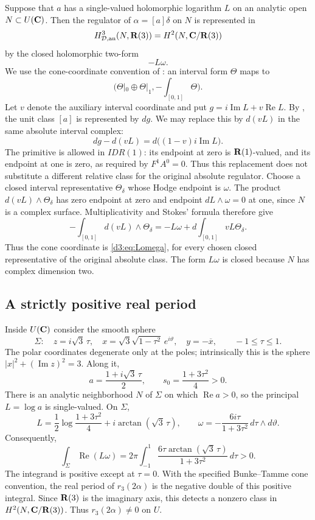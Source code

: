 Suppose that $a$ has a single-valued holomorphic logarithm $L$ on an analytic open $N\subset U(\mathbf C)$. Then the regulator of $\alpha=[a]\delta$ on $N$ is represented in
\[
H_{\mathcal D,\mathrm{an}}^3(N,\mathbf R(3))=H^2(N,\mathbf C/\mathbf R(3))
\]
by the closed holomorphic two-form
\begin{equation}\label{d3:eq:Lomega}
-L\omega.
\end{equation}
We use the cone-coordinate convention of \cite[Proposition~2.8]{BunkeTamme}: an interval form $\Theta$ maps to
\[
\bigl(\Theta|_0\oplus\Theta|_1,-\textstyle\int_{[0,1]}\Theta\bigr).
\]
Let $v$ denote the auxiliary interval coordinate and put $g=i\operatorname{Im}L+v\operatorname{Re}L$.
By \cite[Lemma~4.5]{BunkeTamme}, the unit class $[a]$ is represented by $dg$.
We may replace this by $d(vL)$ in the same absolute interval complex:
\[
dg-d(vL)=d\bigl((1-v)i\operatorname{Im}L\bigr).
\]
The primitive is allowed in $IDR(1)$: its endpoint at zero is
$\mathbf R(1)$-valued, and its endpoint at one is zero, as required by
$F^1A^0=0$. Thus this replacement does not substitute a different
relative class for the original absolute regulator.
Choose a closed interval representative $\Theta_\delta$ whose Hodge endpoint is $\omega$.
The product $d(vL)\wedge\Theta_\delta$ has zero endpoint at zero and
endpoint $dL\wedge\omega=0$ at one, since $N$ is a complex surface.
Multiplicativity and Stokes' formula therefore give
\[
-\int_{[0,1]}d(vL)\wedge\Theta_\delta
=-L\omega+d\int_{[0,1]}vL\Theta_\delta.
\]
Thus the cone coordinate is \eqref{d3:eq:Lomega}, for every chosen
closed representative of the original absolute class. The form
$L\omega$ is closed because $N$ has complex dimension two.

\subsection{A strictly positive real period}
Inside $U(\mathbf C)$ consider the smooth sphere
\[
\Sigma:\quad z=i\sqrt3\,\tau,\quad
x=\sqrt3\sqrt{1-\tau^2}\,e^{i\vartheta},\quad
y=-\overline x,\qquad -1\leq\tau\leq1.
\]
The polar coordinates degenerate only at the poles; intrinsically this is the sphere $|x|^2+(\operatorname{Im}z)^2=3$. Along it,
\[
a=\frac{1+i\sqrt3\,\tau}{2},\qquad
s_0=\frac{1+3\tau^2}{4}>0.
\]
There is an analytic neighborhood $N$ of $\Sigma$ on which $\operatorname{Re}a>0$, so the principal $L=\log a$ is single-valued. On $\Sigma$,
\[
L=\frac12\log\frac{1+3\tau^2}{4}+i\arctan(\sqrt3\,\tau),
\qquad
\omega=-\frac{6i\tau}{1+3\tau^2}\,d\tau\wedge d\vartheta.
\]
Consequently,
\begin{equation}\label{d3:eq:positiveperiod}
\int_{\Sigma}\operatorname{Re}(L\omega)
=2\pi\int_{-1}^{1}
\frac{6\tau\arctan(\sqrt3\,\tau)}{1+3\tau^2}\,d\tau>0.
\end{equation}
The integrand is positive except at $\tau=0$. With the specified Bunke--Tamme cone convention, the real period of $r_3(2\alpha)$ is the negative double of this positive integral. Since $\mathbf R(3)$ is the imaginary axis, this detects a nonzero class in $H^2(N,\mathbf C/\mathbf R(3))$. Thus $r_3(2\alpha)\neq0$ on $U$.

